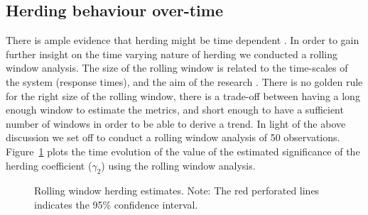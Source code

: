 \documentclass[
  letterpaper,
  DIV=11,
  numbers=noendperiod]{scrartcl}
\begin{document}
\subsection{Herding behaviour
over-time}\label{herding-behaviour-over-time}

There is ample evidence that herding might be time dependent
\citep[see][]{babalos2015, klein2013, stavroyiannis2019}. In order to
gain further insight on the time varying nature of herding we conducted
a rolling window analysis. The size of the rolling window is related to
the time-scales of the system (response times), and the aim of the
research \citep{babalos2015}. There is no golden rule for the right size
of the rolling window, there is a trade-off between having a long enough
window to estimate the metrics, and short enough to have a sufficient
number of windows in order to be able to derive a trend. In light of the
above discussion we set off to conduct a rolling window analysis of 50
observations. Figure~\ref{fig-rolling_window} plots the time evolution
of the value of the estimated significance of the herding coefficient
(\(\gamma_2\)) using the rolling window analysis.

\begin{figure}[H]


\caption{\label{fig-rolling_window}Rolling window herding estimates.
Note: The red perforated lines indicates the 95\% confidence interval.}

\end{figure}%
\end{document}
